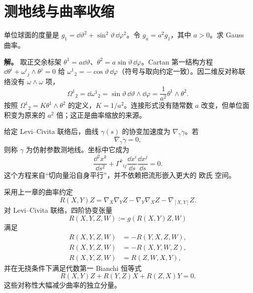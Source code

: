 \section{测地线与曲率收缩}

\begin{workedexample}[球面曲率在整体缩放下怎样变化]
单位球面的度量是 \(g_1=\dd\vartheta^2+\sin^2\vartheta\,\dd\varphi^2\)。令 \(g_a=a^2g_1\)，其中 \(a>0\)。求 Gauss 曲率。

\textbf{解。} 取正交余标架 \(\theta^1=a\dd\vartheta\)、\(\theta^2=a\sin\vartheta\,\dd\varphi\)。Cartan 第一结构方程 \(\dd\theta^i+\omega^i{}_j\wedge\theta^j=0\) 给 \(\omega^1{}_2=-\cos\vartheta\,\dd\varphi\)（符号与取向约定一致）。因二维反对称联络没有 \(\omega\wedge\omega\) 项，
\[
\Omega^1{}_2=\dd\omega^1{}_2
=\sin\vartheta\,\dd\vartheta\wedge\dd\varphi
=\frac1{a^2}\theta^1\wedge\theta^2.
\]
按照 \(\Omega^1{}_2=K\theta^1\wedge\theta^2\) 的定义，\(K=1/a^2\)。连接形式没有随常数 \(a\) 改变，但单位面积变为原来的 \(a^2\) 倍；这正是曲率缩放的来源。
\end{workedexample}


给定 Levi--Civita 联络后，曲线 $\gamma(s)$ 的协变加速度为 $\nabla_{\dot\gamma}\dot\gamma$。若
\begin{equation*}\nabla_{\dot\gamma}\dot\gamma=0,
\end{equation*}
则称 $\gamma$ 为仿射参数测地线。坐标中它成为
\[
\frac{\dd^2x^k}{\dd s^2}
+\Gamma^k{}_{ij}
\frac{\dd x^i}{\dd s}
\frac{\dd x^j}{\dd s}=0.
\]
这个方程来自“切向量沿自身平行”，并不依赖把流形嵌入更大的 欧氏 空间。

采用上一章的曲率约定
\[
R(X,Y)Z
=\nabla_X\nabla_YZ-\nabla_Y\nabla_XZ-\nabla_{[X,Y]}Z.
\]
对 Levi--Civita 联络，四阶协变张量
\[
R(X,Y,Z,W):=g(R(X,Y)Z,W)
\]
满足
\begin{align*}
R(X,Y,Z,W)&=-R(Y,X,Z,W),\\
R(X,Y,Z,W)&=-R(X,Y,W,Z),\\
R(X,Y,Z,W)&=R(Z,W,X,Y),
\end{align*}
并在无挠条件下满足代数第一 Bianchi 恒等式
\[
R(X,Y)Z+R(Y,Z)X+R(Z,X)Y=0.
\]
这些对称性大幅减少曲率的独立分量。

